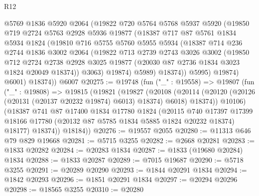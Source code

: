 \begin{lexlean}{R12}
\begin{coremodule}
            @5769
            @1836
            @5920
            @2064
            (@19822
              @720
              @5764
              @5768
              @5937
              @5920
              (@19850
                @719
                @2724
                @5763
                @2928
                @5936
                @19877
                (@18387
                  @717
                  @87
                  @5761
                  @1834
                  @5934
                  @1824
                  (@19810
                    @716
                    @5755
                    @5760
                    @5955
                    @5934
                    (@18387
                      @714
                      @236
                      @2744
                      @1836
                      @3002
                      @2064
                      (@19822
                        @713
                        @2739
                        @2743
                        @3026
                        @3002
                        (@19850
                          @712
                          @2724
                          @2738
                          @2928
                          @3025
                          @19877
                          (@20030 @87 @2736 @1834 @3023 @1824 @20049 @18374))
                        @3063)
                      @19874)
                    @5989)
                  @18374))
              @5995)
            @19874)
          @6001)
        @18374))
    @6007
@20275 := @19748
    (fun ("_" : @19558) =>
    @19807
      (fun ("_" : @19808) =>
      @19815
        (@19821
          (@19827
            (@20108
              (@20114 (@20120 (@20126 (@20131 (@20137 @20232 @19874) @6013) @18374) @6018) @18374))
            @10106)
          (@18387
            @741
            @87
            @17400
            @1834
            @17780
            @1824
            (@20115
              @740
              @17397
              @17399
              @18166
              @17780
              (@20132 @87 @5785 @1834 @5885 @1824 @20232 @18374)
              @18177)
            @18374))
        @18184))
@20276 := @19557 @2055
@20280 := @11313 @646 @79 @829 @19668
@20281 := @5715 @3255
@20282 := @2668 @20281
@20283 := @1833 @20282
@20284 := @20283 @1834
@20287 := @1833 (@19680 @20284) @1834
@20288 := @1833 @20287
@20289 := @7015 @19687
@20290 := @5718 @3255
@20291 := @20289 @20290
@20293 := @1844 @20291 @1834
@20294 := @1842 @20293
@20296 := @1851 @20291 @1834
@20297 := @20294 @20296
@20298 := @18565 @3255
@20310 := @20280

\end{coremodule}
\end{lexlean}
